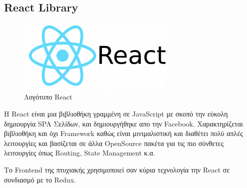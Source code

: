 \subsection{React Library}
\begin{figure}[h]
  \centering
  \includegraphics[width=75mm]{Chapters/3 - Technologies/Images/react-logo_1.png}
  \caption{Λογότυπο React}
  \label{fig:react-logo}
\end{figure}
Η React είναι μια βιβλιοθήκη γραμμένη σε JavaScript με σκοπό την εύκολη δημιουργία SPA Σελίδων, και δημιουργήθηκε απο την Facebook.
Χαρακτηρίζεται βιβλιοθήκη και όχι Framework καθώς είναι μινιμαλιστική και διαθέτει πολύ απλές λειτουργίες και βασίζεται σε άλλα OpenSource πακέτα για τις πιο σύνθετες λειτουργίες όπως Routing, State Management κ.α.

Το Frontend της πτυχιακής χρησιμοποιεί σαν κύρια τεχνολογία την React σε συνδιασμό με το Redux.